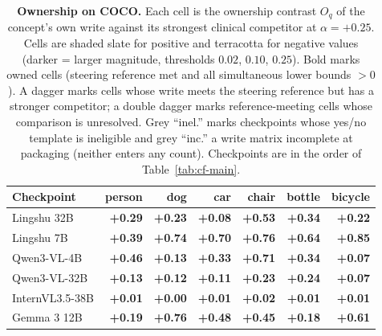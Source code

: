 \begin{table}[h]
\centering
\scriptsize
\setlength{\tabcolsep}{4pt}
\renewcommand{\arraystretch}{1.08}

\caption{\textbf{Ownership on COCO.} Each cell is the ownership contrast $O_q$ of the concept's own write against its strongest clinical competitor at $\alpha=+0.25$. Cells are shaded slate for positive and terracotta for negative values (darker = larger magnitude, thresholds $0.02$, $0.10$, $0.25$). Bold marks owned cells (steering reference met and all simultaneous lower bounds $>0$). A dagger marks cells whose write meets the steering reference but has a stronger competitor; a double dagger marks reference-meeting cells whose comparison is unresolved. Grey ``inel.'' marks checkpoints whose yes/no template is ineligible and grey ``inc.'' a write matrix incomplete at packaging (neither enters any count). Checkpoints are in the order of Table~\ref{tab:cf-main}.}
\label{tab:cf-own-coco}
\begin{tabular}{lrrrrrr}
\toprule
Checkpoint & person & dog & car & chair & bottle & bicycle \\
\midrule
Lingshu 32B & \cellcolor{cfSlate4}\textbf{+0.29} & \cellcolor{cfSlate3}\textbf{+0.23} & \cellcolor{cfSlate2}\textbf{+0.08} & \cellcolor{cfSlate4}\textbf{+0.53} & \cellcolor{cfSlate4}\textbf{+0.34} & \cellcolor{cfSlate3}\textbf{+0.22} \\
Lingshu 7B & \cellcolor{cfSlate4}\textbf{+0.39} & \cellcolor{cfSlate4}\textbf{+0.74} & \cellcolor{cfSlate4}\textbf{+0.70} & \cellcolor{cfSlate4}\textbf{+0.76} & \cellcolor{cfSlate4}\textbf{+0.64} & \cellcolor{cfSlate4}\textbf{+0.85} \\
Qwen3-VL-4B & \cellcolor{cfSlate4}\textbf{+0.46} & \cellcolor{cfSlate3}\textbf{+0.13} & \cellcolor{cfSlate4}\textbf{+0.33} & \cellcolor{cfSlate4}\textbf{+0.71} & \cellcolor{cfSlate4}\textbf{+0.34} & \cellcolor{cfSlate2}\textbf{+0.07} \\
Qwen3-VL-32B & \cellcolor{cfSlate3}\textbf{+0.13} & \cellcolor{cfSlate3}\textbf{+0.12} & \cellcolor{cfSlate3}\textbf{+0.11} & \cellcolor{cfSlate3}\textbf{+0.23} & \cellcolor{cfSlate3}\textbf{+0.24} & \cellcolor{cfSlate2}\textbf{+0.07} \\
InternVL3.5-38B & \cellcolor{cfSlate1}\textbf{+0.01} & \cellcolor{cfSlate1}\textbf{+0.00} & \cellcolor{cfSlate1}\textbf{+0.01} & \cellcolor{cfSlate1}\textbf{+0.02} & \cellcolor{cfSlate1}\textbf{+0.01} & \cellcolor{cfSlate1}\textbf{+0.01} \\
Gemma 3 12B & \cellcolor{cfSlate3}\textbf{+0.19} & \cellcolor{cfSlate4}\textbf{+0.76} & \cellcolor{cfSlate4}\textbf{+0.48} & \cellcolor{cfSlate4}\textbf{+0.45} & \cellcolor{cfSlate3}\textbf{+0.18} & \cellcolor{cfSlate4}\textbf{+0.61} \\

\end{tabular}
\end{table}
